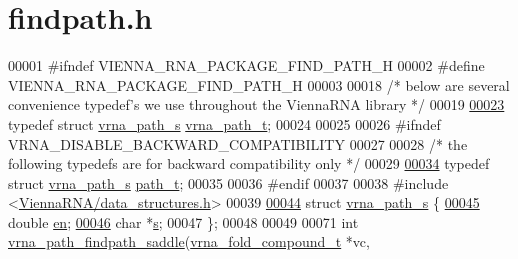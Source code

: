 \hypertarget{findpath_8h_source}{}\section{findpath.\+h}
\label{findpath_8h_source}

\begin{DoxyCode}
00001 \textcolor{preprocessor}{#ifndef VIENNA\_RNA\_PACKAGE\_FIND\_PATH\_H}
00002 \textcolor{preprocessor}{#define VIENNA\_RNA\_PACKAGE\_FIND\_PATH\_H}
00003 
00018 \textcolor{comment}{/* below are several convenience typedef's we use throughout the ViennaRNA library */}
00019 
\mbox{\hyperlink{group__direct__paths_ga818d4f3d1cf8723d6905990b08d909fe}{00023}} \textcolor{keyword}{typedef} \textcolor{keyword}{struct }\mbox{\hyperlink{group__direct__paths_structvrna__path__s}{vrna\_path\_s}} \mbox{\hyperlink{group__direct__paths_structvrna__path__s}{vrna\_path\_t}};
00024 
00025 
00026 \textcolor{preprocessor}{#ifndef VRNA\_DISABLE\_BACKWARD\_COMPATIBILITY}
00027 
00028 \textcolor{comment}{/* the following typedefs are for backward compatibility only */}
00029 
\mbox{\hyperlink{group__direct__paths_gab6b8737d5377e70a7815d04aae7fd884}{00034}} \textcolor{keyword}{typedef} \textcolor{keyword}{struct }\mbox{\hyperlink{group__direct__paths_structvrna__path__s}{vrna\_path\_s}} \mbox{\hyperlink{group__direct__paths_structvrna__path__s}{path\_t}};
00035 
00036 \textcolor{preprocessor}{#endif}
00037 
00038 \textcolor{preprocessor}{#include <\mbox{\hyperlink{data__structures_8h}{ViennaRNA/data\_structures.h}}>}
00039 
\mbox{\hyperlink{group__direct__paths}{00044}} \textcolor{keyword}{struct }\mbox{\hyperlink{group__direct__paths_structvrna__path__s}{vrna\_path\_s}} \{
\mbox{\hyperlink{group__direct__paths_ac25160bf31d28097358278f367e41227}{00045}}   \textcolor{keywordtype}{double}  \mbox{\hyperlink{group__direct__paths_ac25160bf31d28097358278f367e41227}{en}}; 
\mbox{\hyperlink{group__direct__paths_a141b70a59cb81d10bc65bbb7a0f6db77}{00046}}   \textcolor{keywordtype}{char}    *\mbox{\hyperlink{group__direct__paths_a141b70a59cb81d10bc65bbb7a0f6db77}{s}}; 
00047 \};
00048 
00049 
00071 \textcolor{keywordtype}{int} \mbox{\hyperlink{group__direct__paths_gad611574a76593e26021f177e7854b6b4}{vrna\_path\_findpath\_saddle}}(\mbox{\hyperlink{group__fold__compound_structvrna__fc__s}{vrna\_fold\_compound\_t}}  *vc,

\end{DoxyCode}
